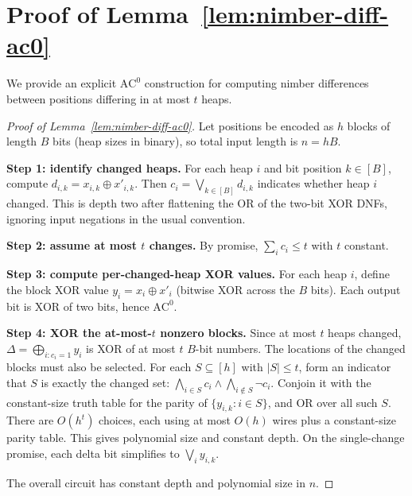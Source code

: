 \documentclass[twoside,11pt]{article}
\newcommand{\AC}{\mathrm{AC}}
\numberwithin{theorem}{section}
\numberwithin{equation}{section}
\begin{document}
\section{Proof of Lemma~\ref{lem:nimber-diff-ac0}}
\label{app:nimberdiff}

We provide an explicit $\AC^0$ construction for computing nimber differences between positions differing in at most $t$ heaps.

\begin{proof}[Proof of Lemma~\ref{lem:nimber-diff-ac0}]
Let positions be encoded as $h$ blocks of length $B$ bits (heap sizes in binary), so total input length is $n=hB$.

\textbf{Step 1: identify changed heaps.}
For each heap $i$ and bit position $k\in[B]$, compute $d_{i,k} = x_{i,k}\oplus x'_{i,k}$.
Then $c_i = \bigvee_{k\in[B]} d_{i,k}$ indicates whether heap $i$ changed.
This is depth two after flattening the OR of the two-bit XOR DNFs, ignoring input negations in the usual convention.

\textbf{Step 2: assume at most $t$ changes.}
By promise, $\sum_i c_i \le t$ with $t$ constant.

\textbf{Step 3: compute per-changed-heap XOR values.}
For each heap $i$, define the block XOR value $y_i = x_i \oplus x'_i$ (bitwise XOR across the $B$ bits). Each output bit is XOR of two bits, hence $\AC^0$.

\textbf{Step 4: XOR the at-most-$t$ nonzero blocks.}
Since at most $t$ heaps changed, $\Delta = \bigoplus_{i:c_i=1} y_i$ is XOR of at most $t$ $B$-bit numbers.
The locations of the changed blocks must also be selected. For each $S\subseteq[h]$ with $|S|\le t$, form an indicator that $S$ is exactly the changed set: $\bigwedge_{i\in S}c_i\wedge\bigwedge_{i\notin S}\neg c_i$. Conjoin it with the constant-size truth table for the parity of $\{y_{i,k}:i\in S\}$, and OR over all such $S$. There are $O(h^t)$ choices, each using at most $O(h)$ wires plus a constant-size parity table. This gives polynomial size and constant depth. On the single-change promise, each delta bit simplifies to $\bigvee_i y_{i,k}$.

The overall circuit has constant depth and polynomial size in $n$.
\end{proof}

\end{document}
